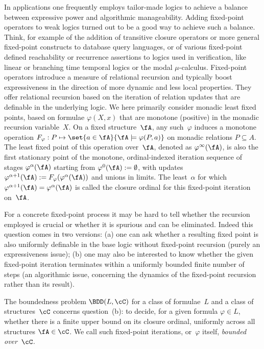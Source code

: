 \documentclass{LMCS}
\begin{document}
In applications one frequently employs tailor-made logics
to achieve a balance between expressive power and algorithmic manageability.
Adding fixed-point operators to weak logics turned out to be a good way
to achieve such a balance.
Think, for example of the addition of transitive closure operators
or more general fixed-point constructs to database
query languages, or of various fixed-point defined reachability
or recurrence assertions to logics used in verification, like 
linear or branching time temporal logics or the modal $\mu$-calculus.
Fixed-point operators introduce a measure of relational recursion and
typically boost expressiveness in the direction of more dynamic and
less local properties. They offer relational recursion based on the 
iteration of relation updates that are definable in the underlying logic.
We here primarily consider monadic least fixed points, based on formulae
$\varphi(X,x)$ that are monotone (positive) in the
monadic recursion variable~$X$.
On a fixed structure~$\fA$,
any such~$\varphi$ induces a monotone operation
$F_\varphi : P \mapsto \set{ a \in \fA }{ \fA \models \varphi(P,a)}$
on monadic relations $P \subseteq A$.
The least fixed point of this operation over~$\fA$,
denoted as $\varphi^\infty(\fA)$, is also the first stationary point
of the monotone, ordinal-indexed iteration sequence of stages $\varphi^\alpha(\fA)$ starting from
$\varphi^0(\fA) := \emptyset$, with updates
$\varphi^{\alpha+1}(\fA) := F_\varphi( \varphi^{\alpha}(\fA))$
and unions in limits. 
The least~$\alpha$ for which
$\varphi^{\alpha+1}(\fA) = \varphi^\alpha(\fA)$ is called the closure
ordinal for this fixed-point iteration on~$\fA$.

For a concrete fixed-point process it may be hard to tell
whether the recursion employed is crucial or whether it is
spurious and can be eliminated.
Indeed this question comes in two versions\?:
(a) one can ask whether a resulting fixed point is also
uniformly definable in the base logic without fixed-point recursion
(purely an expressiveness issue)\?;
(b) one may also be interested to know whether the given fixed-point
iteration terminates within a uniformly bounded finite number
of steps (an algorithmic issue, concerning the dynamics of the
fixed-point recursion rather than its result).

The boundedness problem $\BDD(L,\cC)$
for a class of formulae~$L$
and a class of structures~$\cC$
concerns question~(b)\?: to decide, for a given formula $\varphi \in L$,
whether there is a finite upper bound on its closure
ordinal, uniformly across all structures $\fA \in \cC$.
We call such fixed-point iterations, or~$\varphi$ itself,
\emph{bounded over~$\cC$.}
\end{document}
